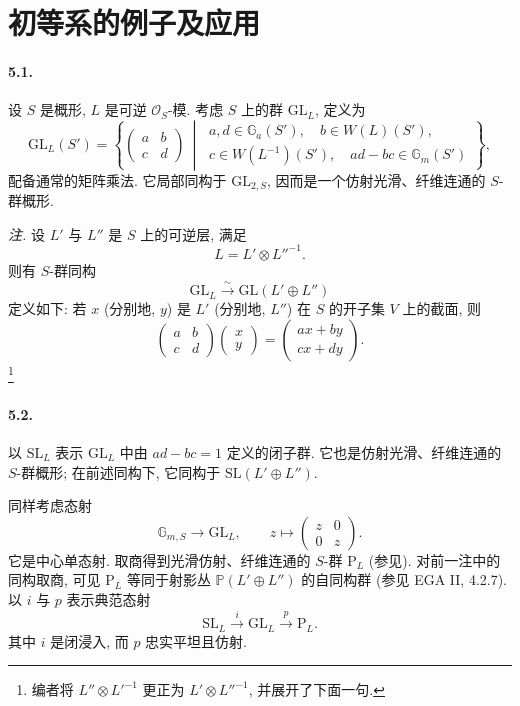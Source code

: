 \section{初等系的例子及应用}
\paragraph{\textbf{5.1.}}
设 \(S\) 是概形, \(L\) 是可逆 \(\mathcal O_S\)-模. 考虑 \(S\) 上的群 \(\mathrm{GL}_L\), 定义为
\[
 \mathrm{GL}_L(S')
 =
 \left\{
 \begin{pmatrix}a&b\\c&d\end{pmatrix}
 \ \middle|\
 \begin{array}{l}
 a,d\in\mathbb G_a(S'),\quad b\in W(L)(S'),\\
 c\in W(L^{-1})(S'),\quad ad-bc\in\mathbb G_m(S')
 \end{array}
 \right\},
\]
配备通常的矩阵乘法. 它局部同构于 \(\mathrm{GL}_{2,S}\), 因而是一个仿射光滑、纤维连通的 \(S\)-群概形.

\smallskip
\noindent\textit{注.}
设 \(L'\) 与 \(L''\) 是 \(S\) 上的可逆层, 满足
\[
 L=L'\otimes L''^{-1}.
\]
则有 \(S\)-群同构
\[
 \mathrm{GL}_L\xrightarrow{\ \sim\ }\mathrm{GL}(L'\oplus L'')
\]
定义如下: 若 \(x\) (分别地, \(y\)) 是 \(L'\) (分别地, \(L''\)) 在 \(S\) 的开子集 \(V\) 上的截面, 则
\[
 \begin{pmatrix}a&b\\c&d\end{pmatrix}
 \begin{pmatrix}x\\y\end{pmatrix}
 =
 \begin{pmatrix}ax+by\\cx+dy\end{pmatrix}.
\]
\footnote{编者将 \(L''\otimes L'^{-1}\) 更正为 \(L'\otimes L''^{-1}\), 并展开了下面一句.}

\paragraph{\textbf{5.2.}}
以 \(\mathrm{SL}_L\) 表示 \(\mathrm{GL}_L\) 中由 \(ad-bc=1\) 定义的闭子群. 它也是仿射光滑、纤维连通的 \(S\)-群概形; 在前述同构下, 它同构于 \(\mathrm{SL}(L'\oplus L'')\).

同样考虑态射
\[
 \mathbb G_{m,S}\longrightarrow\mathrm{GL}_L,
 \qquad
 z\longmapsto\begin{pmatrix}z&0\\0&z\end{pmatrix}.
\]
它是中心单态射. 取商得到光滑仿射、纤维连通的 \(S\)-群 \(\mathrm P_L\) \textup{(参见)}. 对前一注中的同构取商, 可见 \(\mathrm P_L\) 等同于射影丛 \(\mathbb P(L'\oplus L'')\) 的自同构群 \textup{(参见 EGA II, 4.2.7)}. 以 \(i\) 与 \(p\) 表示典范态射
\[
 \mathrm{SL}_L\xrightarrow{\ i\ }\mathrm{GL}_L
   \xrightarrow{\ p\ }\mathrm P_L.
\]
其中 \(i\) 是闭浸入, 而 \(p\) 忠实平坦且仿射.

